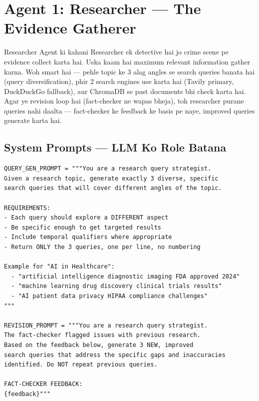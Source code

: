 \documentclass[11pt,a4paper,twoside]{report}
\begin{document}
\section{Agent 1: Researcher --- The Evidence Gatherer}

\begin{storybox}{Researcher Agent ki kahani}
Researcher ek detective hai jo crime scene pe evidence collect karta hai. Uska kaam hai maximum relevant information gather karna. Woh smart hai --- pehle topic ke 3 alag angles se search queries banata hai (query diversification), phir 2 search engines use karta hai (Tavily primary, DuckDuckGo fallback), aur ChromaDB se past documents bhi check karta hai. Agar ye revision loop hai (fact-checker ne wapas bheja), toh researcher purane queries nahi daalta --- fact-checker ke feedback ke basis pe naye, improved queries generate karta hai.
\end{storybox}

\subsection{System Prompts --- LLM Ko Role Batana}

\begin{lstlisting}[style=pythonstyle,caption={Researcher Prompts}]
QUERY_GEN_PROMPT = """You are a research query strategist.
Given a research topic, generate exactly 3 diverse, specific
search queries that will cover different angles of the topic.

REQUIREMENTS:
- Each query should explore a DIFFERENT aspect
- Be specific enough to get targeted results
- Include temporal qualifiers where appropriate
- Return ONLY the 3 queries, one per line, no numbering

Example for "AI in Healthcare":
  - "artificial intelligence diagnostic imaging FDA approved 2024"
  - "machine learning drug discovery clinical trials results"
  - "AI patient data privacy HIPAA compliance challenges"
"""

REVISION_PROMPT = """You are a research query strategist.
The fact-checker flagged issues with previous research.
Based on the feedback below, generate 3 NEW, improved
search queries that address the specific gaps and inaccuracies
identified. Do NOT repeat previous queries.

FACT-CHECKER FEEDBACK:
{feedback}"""
\end{lstlisting}
\end{document}
